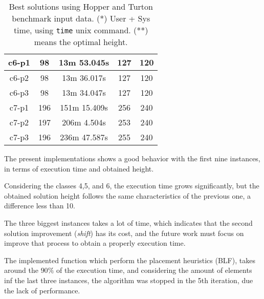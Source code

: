 \begin{table}[h!t]
\begin{tabular}{|c|c|c|c|c|}
        c6-p1             & 98                & 13m 53.045s   & 127             & 120                 \\ \hline
        c6-p2             & 98                & 13m 36.017s   & 127             & 120                 \\ \hline
        c6-p3             & 98                & 13m 34.047s   & 127             & 120                 \\ \hline
        c7-p1             & 196               & 151m 15.409s  & 256             & 240                 \\ \hline
        c7-p2             & 197               & 206m 4.504s   & 253             & 240                 \\ \hline
        c7-p3             & 196               & 236m 47.587s  & 255             & 240                 \\ \hline
    \end{tabular}
    \label{tab:results}
    \caption{Best solutions using Hopper and Turton benchmark input 
data. (*) User + Sys time, using \texttt{time} unix command. (**) means the optimal height.}
\end{table}

The present implementations shows a good behavior with the first nine
instances, in terms of execution time and obtained height.

Considering the classes 4,5, and 6,
the execution time grows significantly,
but the obtained solution height follows the same characteristics
of the previous one, a difference less than 10.

The three biggest instances takes a lot of time,
which indicates that the second solution improvement (\emph{shift}) has its cost,
and the future work must focus on improve that process
to obtain a properly execution time.

The implemented function which perform the placement heuristics (BLF),
takes around the $90\%$ of the execution time, and considering the amount of
elements inf the last three instances, the algorithm was stopped in the 5th iteration,
due the lack of performance.
